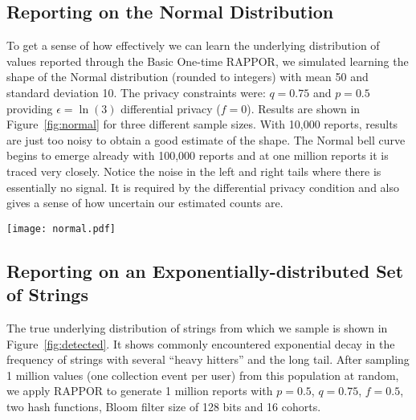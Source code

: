 \documentclass{sig-alternate-2013}
\newcommand\RAPPOR{{RAPPOR}}
\begin{document}
\subsection{Reporting on the Normal Distribution}
To get a sense of how effectively we can learn the underlying distribution of values reported through the Basic One-time \RAPPOR{}, we simulated learning the shape of the Normal distribution (rounded to integers) with mean 50 and standard deviation 10. The privacy constraints were: $q = 0.75$ and $p = 0.5$ providing $\epsilon = \ln(3)$ differential privacy ($f = 0$). Results are shown in Figure~\ref{fig:normal} for three different sample sizes. With 10,000 reports, results are just too noisy to obtain a good estimate of the shape. The Normal bell curve begins to emerge already with 100,000 reports and at one million reports it is traced very closely. Notice the noise in the left and right tails where there is essentially no signal. It is required by the differential privacy condition and also gives a sense of how uncertain our estimated counts are.

\begin{figure*}[!t]
\centering
\texttt{[image: normal.pdf]}
\caption{Simulations of learning the normal distribution with mean 50 and standard deviation 10. The \RAPPOR{} privacy parameters are $q = 0.75$ and $p = 0.5$, corresponding to $\epsilon = \ln(3)$. True sample distribution is shown in black; light green shows the estimated distribution based on the decoded \RAPPOR{} reports. We do not assume \emph{a priori} knowledge of the Normal distribution in learning. If such prior information were available, we could significantly improve upon learning the shape of the distribution via smoothing.}
\label{fig:normal}
\end{figure*}

\subsection{Reporting on an Exponentially-distributed Set of Strings} 
The true underlying distribution of strings from which we sample is shown in Figure~\ref{fig:detected}. It shows commonly encountered exponential decay in the frequency of strings with several ``heavy hitters'' and the long tail. After sampling 1 million values (one collection event per user) from this population at random, we apply \RAPPOR{} to generate 1 million reports with $p = 0.5$, $q = 0.75$, $f = 0.5$, two hash functions, Bloom filter size of 128 bits and 16 cohorts.
\end{document}
